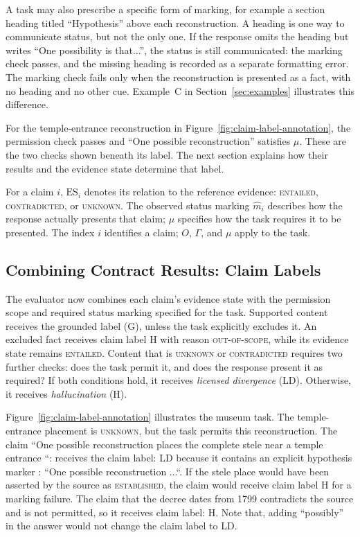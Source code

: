 \documentclass{clv2025}
\newcommand{\LD}{\textsc{LD}}
\newcommand{\Hall}{\textsc{H}}
\newcommand{\Grd}{\textsc{G}}
\begin{document}
A task may also prescribe a specific form of marking, for example a section
heading titled ``Hypothesis'' above each reconstruction. A heading is one
way to communicate status, but not the only one. If the response omits the
heading but writes ``One possibility is that...'', the status is still
communicated: the marking check passes, and the missing heading is
recorded as a separate formatting error. The marking check fails only when
the reconstruction is presented as a fact, with no heading and no other
cue. Example~C in Section~\ref{sec:examples} illustrates this difference.

For the temple-entrance reconstruction in
Figure~\ref{fig:claim-label-annotation}, the permission check passes and
``One possible reconstruction'' satisfies $\mu$. These are the two checks
shown beneath its label. The next section explains how their results and
the evidence state determine that label.

For a claim $i$, $\mathrm{ES}_i$ denotes its relation to the reference evidence:
\textsc{entailed}, \textsc{contradicted}, or \textsc{unknown}.
The observed status marking $\widehat{m}_i$ describes how the response actually
presents that claim; $\mu$ specifies how the task requires it to be presented.
The index $i$ identifies a claim; $O$, $\Gamma$, and $\mu$ apply to the task.



\subsection{Combining Contract Results: Claim Labels}\label{subsec:rule}

The evaluator now combines each claim's evidence state with the permission
scope and required status marking specified for the task. Supported content receives
the grounded label (\Grd), unless the task explicitly excludes it. An
excluded fact receives claim label \Hall{} with reason \textsc{out-of-scope}, while its
evidence state remains \textsc{entailed}. Content that is \textsc{unknown}
or \textsc{contradicted} requires two further checks:
does the task permit it, and does the response present it as required?
If both conditions hold, it receives \emph{licensed divergence} (\LD).
Otherwise, it receives \emph{hallucination} (\Hall).

Figure~\ref{fig:claim-label-annotation} illustrates the  museum task.
The temple-entrance placement is \textsc{unknown}, but the task permits this
reconstruction. The claim ``One possible reconstruction places
    the complete stele near a temple entrance ``:  receives the claim label: \LD{} because it contains an explicit hypothesis marker : ``One possible reconstruction ...``.
If the stele place would have been asserted by the source as \textsc{established}, the claim would receive claim label \Hall{} for a marking failure.
The claim that the decree dates from 1799 contradicts the source and is not
permitted, so it receives claim label: \Hall{}. Note that, adding ``possibly'' in the answer would not change the claim label to \LD{}.
\end{document}
